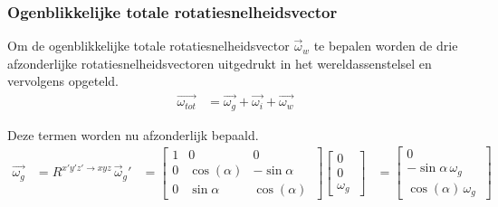 \subsubsection{Ogenblikkelijke totale rotatiesnelheidsvector}
Om de ogenblikkelijke totale rotatiesnelheidsvector $\overrightarrow{\omega}_{w}$ te bepalen worden de drie afzonderlijke rotatiesnelheidsvectoren uitgedrukt in het wereldassenstelsel en vervolgens opgeteld.
\begin{equation*}
\begin{split}
\overrightarrow{\omega_{tot}}
&=\overrightarrow{\omega_{g}}+\overrightarrow{\omega_{i}}+\overrightarrow{\omega_{w}}
\end{split}
\end{equation*}



Deze termen worden nu afzonderlijk bepaald.
\begin{equation*}
\begin{split}
\overrightarrow{\omega_{g}}
&=R^{x'y'z' \rightarrow xyz}\,\overrightarrow{\omega}_{g}'
&=	  \begin{bmatrix}
      1 & 0 & 0\\
      0 & \cos(\alpha) & -\sin{\alpha}\\ 
      0 & \sin{\alpha} & \cos(\alpha)\
      \end{bmatrix}
      \begin{bmatrix}
      0\\
      0\\
      \omega_{g}\
      \end{bmatrix}     
&=	  \begin{bmatrix}
      0\\
      -\sin{\alpha}\,\omega_{g}\\
      \cos(\alpha)\,\omega_{g}\
      \end{bmatrix}
\end{split}
\end{equation*}

